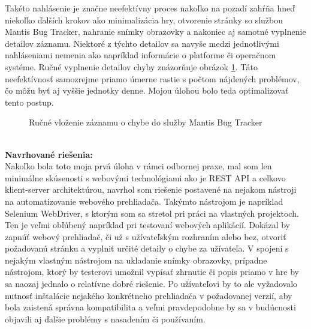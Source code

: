 \documentclass[slovak, bachelorpractice]{diploma}
\begin{document}
Takéto nahlásenie je značne neefektívny proces nakoľko na pozadí zahŕňa hneď niekoľko ďalších krokov ako minimalizácia hry, otvorenie stránky so službou Mantis Bug Tracker, nahranie snímky obrazovky a nakoniec aj samotné vyplnenie detailov záznamu. Niektoré z týchto detailov sa navyše medzi jednotlivými nahláseniami nemenia ako napríklad informácie o platforme či operačnom systéme. Ručné vyplnenie detailov chyby znázorňuje obrázok \ref{pic:Mantis}.
Táto neefektívnosť samozrejme priamo úmerne rastie s počtom nájdených problémov, čo môžu byť aj vyššie jednotky denne. Mojou úlohou bolo teda optimalizovať tento postup.
\begin{figure}[!htbp]
	\centering
	\caption{Ručné vloženie záznamu o chybe do služby Mantis Bug Tracker}
	\label{pic:Mantis}
\end{figure} \\
\textbf{Navrhované riešenia:} \\ Nakoľko bola toto moja prvá úloha v rámci odbornej praxe, mal som len minimálne skúsenosti s webovými technológiami ako je REST API a celkovo klient-server architektúrou, navrhol som riešenie postavené na nejakom nástroji na automatizovanie webového prehliadača. Takýmto nástrojom je napríklad Selenium WebDriver, s ktorým som sa stretol pri práci na vlastných projektoch. Ten je veľmi obľúbený napríklad pri testovaní webových aplikácií. Dokázal by zapnúť webový prehliadač, či už s užívateľským rozhraním alebo bez, otvoriť požadovanú stránku a vyplniť určité detaily o chybe za užívateľa. V spojení s nejakým vlastným nástrojom na ukladanie snímky obrazovky, prípadne nástrojom, ktorý by testerovi umožnil vypísať zhrnutie či popis priamo v hre by sa naozaj jednalo o relatívne dobré riešenie. Po užívateľovi by to ale vyžadovalo nutnosť inštalácie nejakého konkrétneho prehliadača v požadovanej verzií, aby bola zaistená správna kompatibilita a veľmi pravdepodobne by sa v budúcnosti objavili aj ďalšie problémy s nasadením či používaním. 
\end{document}
